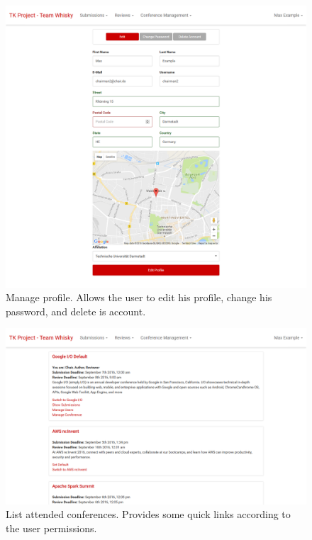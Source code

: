 \documentclass[nochapterpage,nopartpage,noheadingspace,numbersubsubsec,bigchapter,colorback,accentcolor=tud9c,10pt]{tudreport}
\begin{document}
        \begin{figure}[!ht]
            \centering
            \includegraphics[width=\textwidth]{img/ui-manage-profile}
            \caption{Manage profile. Allows the user to edit his profile, change his password, and delete is account.}
            \label{fig:appendix:screenshots:ui-manage-profile}
        \end{figure}

        \begin{figure}[!ht]
            \centering
            \includegraphics[width=\textwidth]{img/ui-list-conferences}
            \caption{List attended conferences. Provides some quick links according to the user permissions.}
            \label{fig:appendix:screenshots:ui-list-conferences}
        \end{figure}
\end{document}
